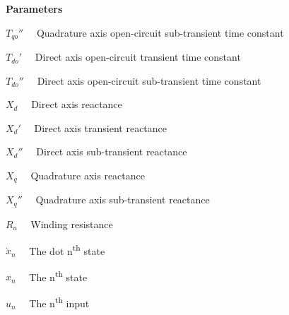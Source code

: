 \documentclass[letterpaper]{article}
\begin{document}
{\bfseries
Parameters}

 $T_{\mathit{qo}}''$ \ \ Quadrature axis open-circuit sub-transient time
constant

 $T_{\mathit{do}}'$ \ \ Direct axis open-circuit transient time constant

 $T_{\mathit{do}}''$ \ \ Direct axis open-circuit sub-transient time
constant

 $X_{d}$ \ \ Direct axis reactance

 $X_{d}'$ \ \ Direct axis transient reactance

 $X_{d}''$ \ \ Direct axis sub-transient reactance

 $X_{q}$ \ \ Quadrature axis reactance

 $X_{q}''$ \ \ Quadrature axis sub-transient reactance

 $R_{a}$ \ \ Winding resistance


\bigskip

 $\dot{x}_{n}$ \ \ The dot n\textsuperscript{th} state

 $x_{n}$ \ \ The n\textsuperscript{th} state

 $u_{n}$ \ \ The n\textsuperscript{th} input
\end{document}

